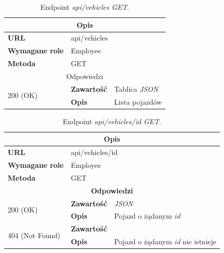 \documentclass[eng,printmode,openany]{mgr}
\begin{document}
\begin{table}[H]
	\caption{Endpoint \textit{api/vehicles GET}.}
	\begin{tabularx}{\textwidth}{|l|l|X|}
		\hline
		\multicolumn{3}{|c|}{\textbf{\textbf{Opis}}}
		\\ \hline
		\textbf{URL}                         & \multicolumn{2}{l|}{api/vehicles}
		\\ \hline
		\textbf{Wymagane role}               & \multicolumn{2}{l|}{Employee}
		\\ \hline
		\textbf{Metoda}                      & \multicolumn{2}{l|}{GET}
		\\ \hline
		\multicolumn{3}{|c|}{ Odpowiedzi}
		\\ \hline
		\multirow{2}{*}{200 (OK)}   & \textbf{Zawartość}         & Tablica \textit{JSON}
		\\ \cline{2-3}              & \textbf{Opis}         	    & Lista pojazdów
		\\ \hline
	\end{tabularx}
\end{table}

\begin{table}[H]
	\caption{Endpoint \textit{api/vehicles/id GET}.}
	\begin{tabularx}{\textwidth}{|l|l|X|}
		\hline
		\multicolumn{3}{|c|}{\textbf{\textbf{Opis}}}
		\\ \hline
		\textbf{URL}                         & \multicolumn{2}{l|}{api/vehicles/id}
		\\ \hline
		\textbf{Wymagane role}               & \multicolumn{2}{l|}{Employee}
		\\ \hline
		\textbf{Metoda}                      & \multicolumn{2}{l|}{GET}
		\\ \hline
		\multicolumn{3}{|c|}{\textbf{Odpowiedzi}}
		\\ \hline
		\multirow{2}{*}{200 (OK)} 	        & \textbf{Zawartość}   	& \textit{JSON}
		\\ \cline{2-3}                      & \textbf{Opis}         	& Pojazd o żądanym \textit{id}
		\\ \hline
		\multirow{2}{*}{404 (Not Found)} 	& \textbf{Zawartość}     & 
		\\ \cline{2-3}                      & \textbf{Opis}          & Pojazd o żądanym \textit{id} nie istnieje
		\\ \hline
	\end{tabularx}
\end{table}
\end{document}
